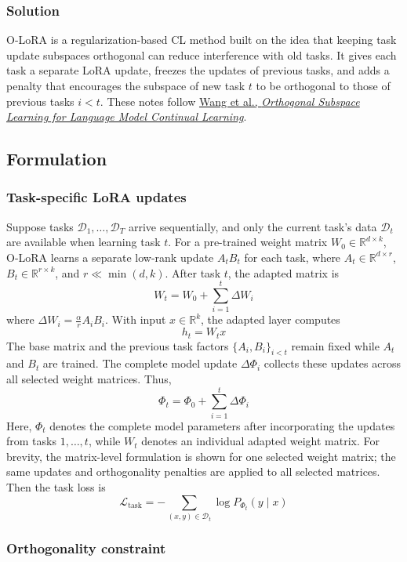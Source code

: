 \subsubsection{Solution}
O-LoRA is a regularization-based CL method built on the idea that keeping task update subspaces orthogonal can reduce interference with old tasks. It gives each task a separate LoRA update, freezes the updates of previous tasks, and adds a penalty that encourages the subspace of new task \(t\) to be orthogonal to those of previous tasks \(i<t\). These notes follow \href{https://arxiv.org/abs/2310.14152}{Wang et al., \emph{Orthogonal Subspace Learning for Language Model Continual Learning}}.

\subsection{Formulation}

\subsubsection{Task-specific LoRA updates}

Suppose tasks \(\mathcal{D}_1,\ldots,\mathcal{D}_T\) arrive sequentially, and only the current task's data \(\mathcal{D}_t\) are available when learning task \(t\). For a pre-trained weight matrix \(W_0 \in \mathbb{R}^{d \times k}\), O-LoRA learns a separate low-rank update \(A_t B_t\) for each task, where \(A_t \in \mathbb{R}^{d \times r}\), \(B_t \in \mathbb{R}^{r\times k}\), and \(r \ll \min(d,k)\). After task \(t\), the adapted matrix is
\[
	W_t = W_0 + \sum_{i=1}^{t} \Delta W_i
\]
where \(\Delta W_i = \frac{\alpha}{r} A_i B_i\).
With input \(x\in\mathbb{R}^{k}\), the adapted layer computes
\[
	h_t = W_t x
\]
The base matrix and the previous task factors \(\{A_i,B_i\}_{i<t}\) remain fixed while \(A_t\) and \(B_t\) are trained.
The complete model update \(\Delta\Phi_i\) collects these updates across all selected weight matrices. Thus,
\[
	\Phi_t = \Phi_0+\sum_{i=1}^{t}\Delta\Phi_i
\]
Here, \(\Phi_t\) denotes the complete model parameters after incorporating the updates from tasks \(1,\ldots,t\), while \(W_t\) denotes an individual adapted weight matrix.
For brevity, the matrix-level formulation is shown for one selected weight matrix; the same updates and orthogonality penalties are applied to all selected matrices.
Then the task loss is
\[
	\mathcal{L}_{\mathrm{task}} =
	- \sum_{(x,y)\in\mathcal{D}_t}\log P_{\Phi_t}(y\mid x)
\]

\subsubsection{Orthogonality constraint}


